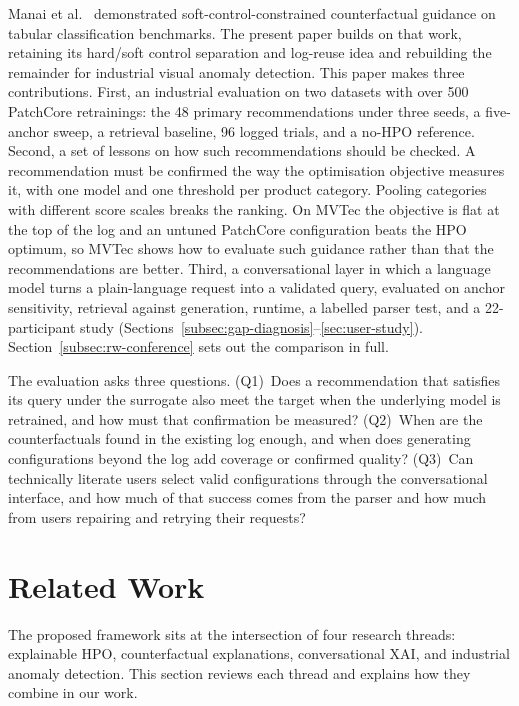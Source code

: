 \documentclass[final,5p,times,twocolumn]{elsarticle}
\begin{document}
Manai et al.\ \cite{manai_cfhpo_conference} demonstrated
soft-control-constrained counterfactual guidance on tabular
classification benchmarks. The present paper builds on that work,
retaining its hard/soft control separation and log-reuse idea and
rebuilding the remainder for industrial visual anomaly detection. This paper makes three contributions. First, an industrial evaluation on two datasets with over 500 PatchCore retrainings: the 48 primary recommendations under three seeds, a five-anchor sweep, a retrieval baseline, 96 logged trials, and a no-HPO reference. Second, a set of lessons on how such recommendations should be checked. A recommendation must be confirmed the way the optimisation objective measures it, with one model and one threshold per product category. Pooling categories with different score scales breaks the ranking. On MVTec the objective is flat at the top of the log and an untuned PatchCore configuration beats the HPO optimum, so MVTec shows how to evaluate such guidance rather than that the recommendations are better. Third, a conversational layer in which a language model turns a plain-language request into a validated query, evaluated on anchor sensitivity, retrieval against generation, runtime, a labelled parser test, and a 22-participant study (Sections~\ref{subsec:gap-diagnosis}--\ref{sec:user-study}).
Section~\ref{subsec:rw-conference} sets out the comparison in full.

The evaluation asks three questions. (Q1)~Does a recommendation that satisfies its query under the surrogate also meet the target when the underlying model is retrained, and how must that confirmation be measured? (Q2)~When are the counterfactuals found in the existing log enough, and when does generating configurations beyond the log add coverage or confirmed quality? (Q3)~Can technically literate users select valid configurations through the conversational interface, and how much of that success comes from the parser and how much from users repairing and retrying their requests?

\section{Related Work}
\label{sec:related-work}

The proposed framework sits at the intersection of four research
threads: explainable HPO, counterfactual explanations, conversational
XAI, and industrial anomaly detection. This section reviews each
thread and explains how they combine in our work.
\end{document}
